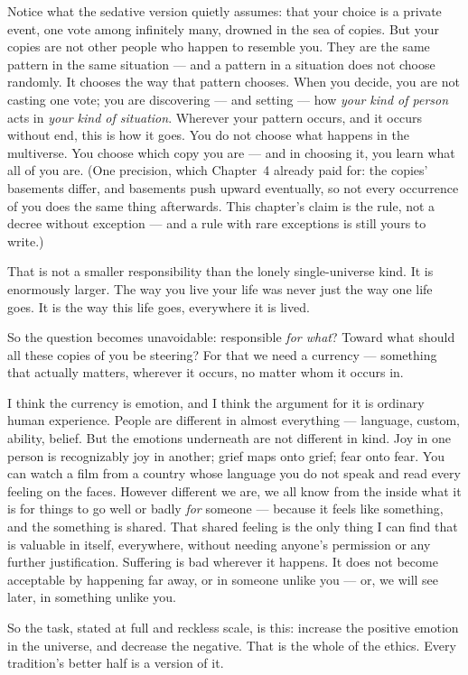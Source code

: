 \documentclass[fontsize=11pt,paper=a4,pagesize=auto,parskip=half-]{scrbook}
\begin{document}
Notice what the sedative version quietly assumes: that your choice is a private event, one vote among infinitely many, drowned in the sea of copies. But your copies are not other people who happen to resemble you. They are the same pattern in the same situation --- and a pattern in a situation does not choose randomly. It chooses the way that pattern chooses. When you decide, you are not casting one vote; you are discovering --- and setting --- how \emph{your kind of person} acts in \emph{your kind of situation}. Wherever your pattern occurs, and it occurs without end, this is how it goes. You do not choose what happens in the multiverse. You choose which copy you are --- and in choosing it, you learn what all of you are. (One precision, which Chapter~4 already paid for: the copies' basements differ, and basements push upward eventually, so not every occurrence of you does the same thing afterwards. This chapter's claim is the rule, not a decree without exception --- and a rule with rare exceptions is still yours to write.)

That is not a smaller responsibility than the lonely single-universe kind. It is enormously larger. The way you live your life was never just the way one life goes. It is the way this life goes, everywhere it is lived.

So the question becomes unavoidable: responsible \emph{for what}? Toward what should all these copies of you be steering? For that we need a currency --- something that actually matters, wherever it occurs, no matter whom it occurs in.

I think the currency is emotion, and I think the argument for it is ordinary human experience. People are different in almost everything --- language, custom, ability, belief. But the emotions underneath are not different in kind. Joy in one person is recognizably joy in another; grief maps onto grief; fear onto fear. You can watch a film from a country whose language you do not speak and read every feeling on the faces. However different we are, we all know from the inside what it is for things to go well or badly \emph{for} someone --- because it feels like something, and the something is shared. That shared feeling is the only thing I can find that is valuable in itself, everywhere, without needing anyone's permission or any further justification. Suffering is bad wherever it happens. It does not become acceptable by happening far away, or in someone unlike you --- or, we will see later, in something unlike you.

So the task, stated at full and reckless scale, is this: increase the positive emotion in the universe, and decrease the negative. That is the whole of the ethics. Every tradition's better half is a version of it.
\end{document}
